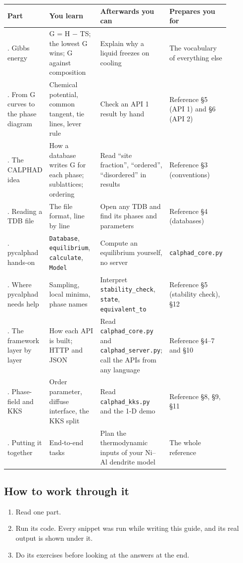 \documentclass[12pt,a4paper]{article}
\begin{document}
\begingroup\small
\begin{longtable}{>{\raggedright\arraybackslash}p{0.161\linewidth}>{\raggedright\arraybackslash}p{0.247\linewidth}>{\raggedright\arraybackslash}p{0.297\linewidth}>{\raggedright\arraybackslash}p{0.188\linewidth}}
\toprule
\textbf{Part} & \textbf{You learn} & \textbf{Afterwards you can} & \textbf{Prepares you for} \\
\midrule
\endhead
1. Gibbs energy & G = H \(-\) TS; the lowest G wins; G against composition & Explain why a liquid freezes on cooling & The vocabulary of everything else \\
2. From G curves to the phase diagram & Chemical potential, common tangent, tie lines, lever rule & Check an API 1 result by hand & Reference \S{}5 (API 1) and \S{}6 (API 2) \\
3. The CALPHAD idea & How a database writes G for each phase; sublattices; ordering & Read ``site fraction'', ``ordered'', ``disordered'' in results & Reference \S{}3 (conventions) \\
4. Reading a TDB file & The file format, line by line & Open any TDB and find its phases and parameters & Reference \S{}4 (databases) \\
5. pycalphad hands-on & \texttt{Database}, \texttt{equilibrium}, \texttt{calculate}, \texttt{Model} & Compute an equilibrium yourself, no server & \texttt{calphad\_\allowbreak{}core.\allowbreak{}py} \\
6. Where pycalphad needs help & Sampling, local minima, phase names & Interpret \texttt{stability\_\allowbreak{}check}, \texttt{state}, \texttt{equivalent\_\allowbreak{}to} & Reference \S{}5 (stability check), \S{}12 \\
7. The framework layer by layer & How each API is built; HTTP and JSON & Read \texttt{calphad\_\allowbreak{}core.\allowbreak{}py} and \texttt{calphad\_\allowbreak{}server.\allowbreak{}py}; call the APIs from any language & Reference \S{}4--7 and \S{}10 \\
8. Phase-field and KKS & Order parameter, diffuse interface, the KKS split & Read \texttt{calphad\_\allowbreak{}kks.\allowbreak{}py} and the 1-D demo & Reference \S{}8, \S{}9, \S{}11 \\
9. Putting it together & End-to-end tasks & Plan the thermodynamic inputs of your Ni--Al dendrite model & The whole reference \\
\bottomrule
\end{longtable}
\endgroup

\subsection*{How to work through it}
\begin{enumerate}
\item Read one part.
\item Run its code. Every snippet was run while writing this guide, and its real output is shown under it.
\item Do its exercises before looking at the answers at the end.
\end{enumerate}
\end{document}
